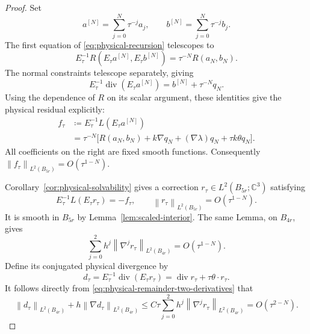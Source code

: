 \documentclass[11pt]{article}
\newcommand{\C}{\mathbb C}
\DeclareMathOperator{\diverg}{div}
\newcommand{\norm}[1]{\left\lVert #1\right\rVert}
\theoremstyle{remark}
\numberwithin{equation}{section}
\begin{document}
\begin{proof}
Set
\[
 a^{[N]}=\sum_{j=0}^N\tau^{-j}a_j,
 \qquad b^{[N]}=\sum_{j=0}^N\tau^{-j}b_j.
\]
The first equation of \eqref{eq:physical-recursion} telescopes
to
\begin{equation}
\label{eq:truncated-vector-residual}
 E_\tau^{-1}R(E_\tau a^{[N]},E_\tau b^{[N]})
       =\tau^{-N}R(a_N,b_N).
\end{equation}
The normal constraints telescope separately, giving
\begin{equation}
\label{eq:truncated-divergence}
 E_\tau^{-1}\diverg(E_\tau a^{[N]})
       =b^{[N]}+\tau^{-N}q_N.
\end{equation}
Using the dependence of $R$ on its scalar argument, these
identities give the physical residual explicitly:
\begin{equation}
\label{eq:physical-truncated-residual}
\begin{aligned}
 f_\tau
 &\coloneqq E_\tau^{-1}L(E_\tau a^{[N]})\\
 &=\tau^{-N}\bigl[R(a_N,b_N)+k\nabla q_N
           +(\nabla\lambda)q_N+\tau k\theta q_N\bigr].
\end{aligned}
\end{equation}
All coefficients on the right are fixed smooth functions.
Consequently $\norm{f_\tau}_{L^2(B_{5r})}=O(\tau^{1-N})$.

Corollary~\ref{cor:physical-solvability} gives a correction
$r_\tau\in L^2(B_{5r};\C^3)$ satisfying
\[
 E_\tau^{-1}L(E_\tau r_\tau)=-f_\tau,
 \qquad \norm{r_\tau}_{L^2(B_{5r})}=O(\tau^{1-N}).
\]
It is smooth in $B_{5r}$ by Lemma~\ref{lem:scaled-interior}.
The same Lemma, on $B_{4r}$, gives
\begin{equation}
\label{eq:physical-remainder-two-derivatives}
 \sum_{j=0}^2h^j\norm{\nabla^jr_\tau}_{L^2(B_{4r})}
                      =O(\tau^{1-N}).
\end{equation}
Define its conjugated physical divergence by
\[
 d_\tau=E_\tau^{-1}\diverg(E_\tau r_\tau)
             =\diverg r_\tau+\tau\theta\cdot r_\tau.
\]
It follows directly from
\eqref{eq:physical-remainder-two-derivatives} that
\begin{equation}
\label{eq:physical-divergence-remainder}
 \norm{d_\tau}_{L^2(B_{4r})}
    +h\norm{\nabla d_\tau}_{L^2(B_{4r})}
 \le C\tau\sum_{j=0}^2h^j
                    \norm{\nabla^jr_\tau}_{L^2(B_{4r})}
 =O(\tau^{2-N}).
\end{equation}


\end{proof}
\end{document}

